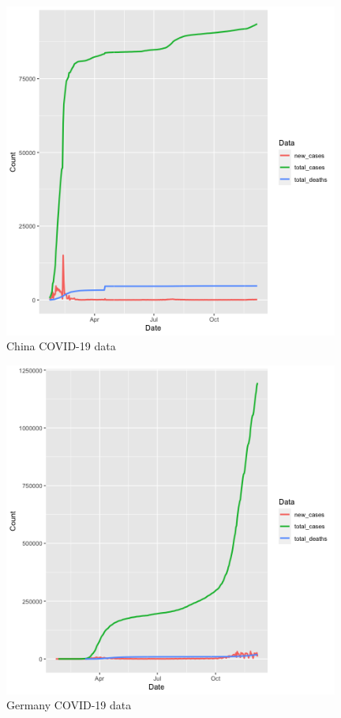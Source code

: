 \documentclass[11pt]{article}
\begin{document}
\begin{figure}[h!]
\centering
  \includegraphics[width=110mm]{R-Code/plots/chinaCovid.png} 
  \caption{China COVID-19 data}
\end{figure}

\begin{figure}[!h]
\centering
  \includegraphics[width=110mm]{R-Code/plots/germanyCovid.png}   
  \caption{Germany COVID-19 data}
  \end{figure}
\end{document}

